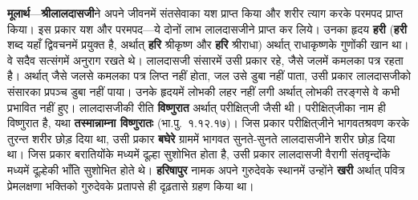\begin{sloppypar}\justifying{}
\textbf{मूलार्थ}—\textbf{श्रीलालदासजी}ने अपने जीवनमें संतसेवाका यश प्राप्त किया और शरीर त्याग करके परमपद प्राप्त किया। इस प्रकार यश और परमपद—ये दोनों लाभ लालदासजीने प्राप्त कर लिये। उनका हृदय \textbf{हरी} (\textbf{हरी} शब्द यहाँ द्विवचनमें प्रयुक्त है, अर्थात् \textbf{हरि} श्रीकृष्ण और \textbf{हरि} श्रीराधा) अर्थात् राधा\-कृष्णके गुणोंकी खान था। वे सदैव सत्संगमें अनुराग रखते थे। लालदासजी संसारमें उसी प्रकार रहे, जैसे जलमें कमलका पत्र रहता है। अर्थात् जैसे जलसे कमलका पत्र लिप्त नहीं होता, जल उसे डुबा नहीं पाता, उसी प्रकार लालदासजीको संसारका प्रपञ्च डुबा नहीं पाया। उनके हृदयमें लोभकी लहर नहीं लगी अर्थात् लोभकी तरङ्गसे वे कभी प्रभावित नहीं हुए। लालदासजीकी रीति \textbf{विष्णुरात} अर्थात् परीक्षित्‌जी जैसी थी। परीक्षित्‌जीका नाम ही विष्णुरात है, यथा \textbf{तस्मान्नाम्ना विष्णुरातः} (भा.पु.~१.१२.१७)। जिस प्रकार परीक्षित्‌जीने भागवत\-श्रवण करके तुरन्त शरीर छोड़ दिया था, उसी प्रकार \textbf{बघेरे} ग्राममें भागवत सुनते-सुनते लालदासजीने शरीर छोड़ दिया था। जिस प्रकार बरातियोंके मध्यमें दूल्हा सुशोभित होता है, उसी प्रकार लालदासजी वैरागी संतवृन्दोंके मध्यमें दूल्हेकी भाँति सुशोभित होते थे। \textbf{हरिषापुर} नामक अपने गुरुदेवके स्थानमें उन्होंने \textbf{खरी} अर्थात् पवित्र प्रेमलक्षणा भक्तिको गुरुदेवके प्रतापसे ही दृढ़तासे ग्रहण किया था।
\end{sloppypar}



